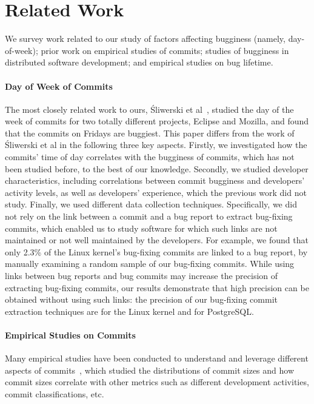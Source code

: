 \section{Related Work}
\label{sec-related}

We survey work related to our study of factors affecting bugginess (namely,
day-of-week); prior work on empirical studies of commits; studies of bugginess
in distributed software development; and empirical studies on bug lifetime.

\paragraph{Day of Week of Commits}

The most closely related work to ours, \'Sliwerski et
al~\cite{sliwerski-msr-2005}, studied the day of the week of commits for two
totally different projects, Eclipse and Mozilla, and found that the commits on
Fridays are buggiest.  This paper differs from the work of \'Sliwerski et al in
the following three key aspects.  Firstly, we investigated how the commits' time
of day correlates with the bugginess of commits, which has not been studied
before, to the best of our knowledge.  Secondly, we studied developer
characteristics, including correlations between commit bugginess and developers'
activity levels, as well as developers' experience, which the previous work did
not study.  Finally, we used different data collection techniques. Specifically,
we did not rely on the link between a commit and a bug report to extract
bug-fixing commits, which enabled us to study software for which such links are
not maintained or not well maintained by the developers. For example, we found
that only 2.3\% of the Linux kernel's bug-fixing commits are linked to a bug
report, by manually examining a random sample of our bug-fixing commits.  While
using links between bug reports and bug commits may increase the precision of
extracting bug-fixing commits, our results demonstrate that high precision can
be obtained without using such links: the precision of our bug-fixing commit
extraction techniques are \linuxP for the Linux kernel and \postP for
PostgreSQL.


\paragraph{Empirical Studies on Commits}

Many empirical studies have been conducted to understand and leverage different
aspects of
commits~\cite{hattori2008nature,largeCommits,commitTextualClassification,
  smallCommits05, Swanson76}, which studied the distributions of commit sizes
and how commit sizes correlate with other metrics such as different development
activities, commit classifications, etc.

